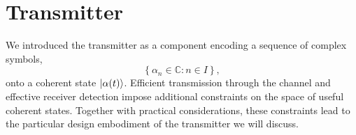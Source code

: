 \section{Transmitter}                                                                                                                                                                                                                                                                                                                                                                                                                                                                                                                                                                                                                                                                                                                     

We introduced the transmitter as a component encoding a sequence of complex symbols,
\begin{equation}
	\left\{
		\alpha_n\in\mathbb{C}
		\colon
		n\in I
	\right\}
	,
\end{equation}
onto a coherent state $\lvert\alpha(t)\rangle$.
Efficient transmission through the channel and effective receiver detection impose additional constraints on the space of useful coherent states.
Together with practical considerations, these constraints lead to the particular design embodiment of the transmitter we will discuss.


